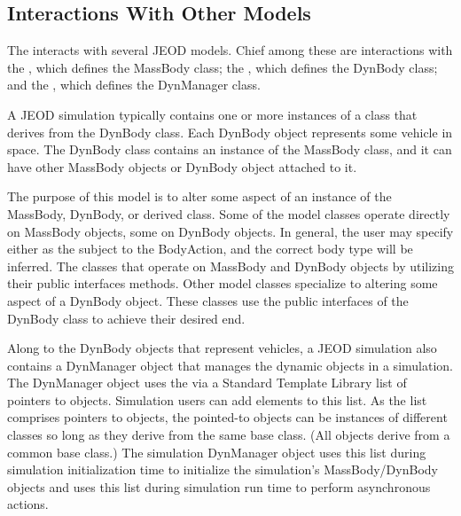 \subsection{Interactions With Other Models}
The \ModelDesc interacts with several JEOD models. Chief among these
are interactions with
the ,
which defines the MassBody class;
the ,
which defines the DynBody class; and
the ,
which defines the DynManager class.

A JEOD simulation typically contains one or more instances of a
class that derives from the DynBody class.
Each DynBody object represents some vehicle in space.
The DynBody class contains an instance of the MassBody class,
and it can have other MassBody objects or DynBody object attached to it.

The purpose of this model is to alter some aspect of an instance of the
MassBody, DynBody, or derived class.
Some of the model classes operate directly on MassBody objects, some on DynBody
objects. In general, the user may specify either as the subject to the BodyAction,
and the correct body type will be inferred.
The \ModelDesc classes that operate on MassBody and DynBody objects
by utilizing their public interfaces methods.
Other model classes specialize to altering some aspect of a DynBody object.
These classes use the public interfaces of the DynBody class to achieve
their desired end.

Along to the DynBody objects that represent vehicles,
a JEOD simulation also contains a DynManager object that manages the
dynamic objects in a simulation.
The DynManager object uses the \ModelDesc via a Standard Template Library
list of pointers to \ModelDesc objects. Simulation users can add
elements to this list. As the list comprises pointers to objects, the
pointed-to objects can be instances of different classes so long as
they derive from the same base class. (All \ModelDesc objects derive
from a common base class.)
The simulation DynManager object uses this list during simulation
initialization time to initialize the simulation's MassBody/DynBody objects
and uses this list during simulation run time to perform
asynchronous actions.

